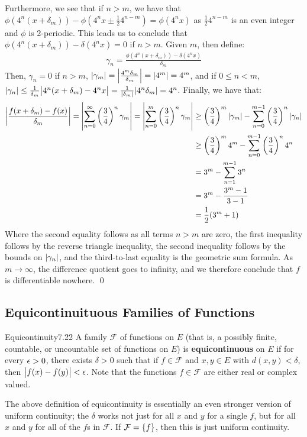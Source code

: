 \begin{nproof}
    Furthermore, we see that if $n > m$, we have that $\phi(4^n(x + \delta_m)) - \phi(4^nx \pm \frac{1}{2}4^{n-m}) = \phi(4^nx)$ as $\frac{1}{2}4^{n-m}$ is an even integer and $\phi$ is 2-periodic. This leads us to conclude that $\phi(4^n(x + \delta_m)) - \delta(4^nx) = 0$ if $n > m$. Given $m$, then define:
    \begin{align*}
        \gamma_n = \frac{\phi(4^n(x + \delta_m)) - \delta(4^nx)}{\delta_m}
    \end{align*}
    Then, $\gamma_n = 0$ if $n > m$, $\abs{\gamma_m} = \abs{\frac{4^m\delta_m}{\delta_m}} = \abs{4^m} =4^m$, and if $0 \leq n < m$, $\abs{\gamma_n} \leq \frac{1}{\delta_m}\abs{4^n(x + \delta_m) - 4^nx} = \frac{1}{\abs{\delta_m}}\abs{4^n\delta_m} = 4^n$. Finally, we have that:
    \begin{align*}
        \abs{\frac{f(x + \delta_m) - f(x)}{\delta_m}} = \abs{\sum_{n=0}^\infty \left(\frac{3}{4}\right)^n\gamma_m} = \abs{\sum_{n=0}^m \left(\frac{3}{4}\right)^n\gamma_m} &\geq \left(\frac{3}{4}\right)^m\abs{\gamma_m} - \sum_{n=0}^{m-1}\left(\frac{3}{4}\right)^n\abs{\gamma_n}
        \\ &\geq \left(\frac{3}{4}\right)^m4^m - \sum_{n=0}^{m-1}\left(\frac{3}{4}\right)^n4^n
        \\ &= 3^m - \sum_{n=1}^{m-1}3^n
        \\ &= 3^m - \frac{3^m - 1}{3 - 1}
        \\ &= \frac{1}{2}(3^m + 1)
    \end{align*}
    Where the second equality follows as all terms $n > m$ are zero, the first inequality follows by the reverse triangle inequality, the second inequality follows by the bounds on $\abs{\gamma_n}$, and the third-to-last equality is the geometric sum formula. As $m \rightarrow \infty$, the difference quotient goes to infinity, and we therefore conclude that $f$ is differentiable nowhere. \qed
\end{nproof}

\subsection{Equicontinuituous Families of Functions}
\setcounter{rudin}{21}
\begin{definition}{Equicontinuity}{7.22}
    A family $\mathcal{F}$ of functions on $E$ (that is, a possibly finite, countable, or uncountable set of functions on $E$) is \textbf{equicontinuous} on $E$ if for every $\epsilon > 0$, there exists $\delta > 0$ such that if $f \in \mathcal{F}$ and $x, y \in E$ with $d(x, y) < \delta$, then $\abs{f(x) - f(y)} < \epsilon$. Note that the functions $f \in \mathcal{F}$ are either real or complex valued.
\end{definition}
\noindent The above definition of equicontinuity is essentially an even stronger version of uniform continuity; the $\delta$ works not just for all $x$ and $y$ for a single $f$, but for all $x$ and $y$ for all of the $f$s in $\mathcal{F}$. If $\mathcal{F} = \set{f}$, then this is just uniform continuity.

